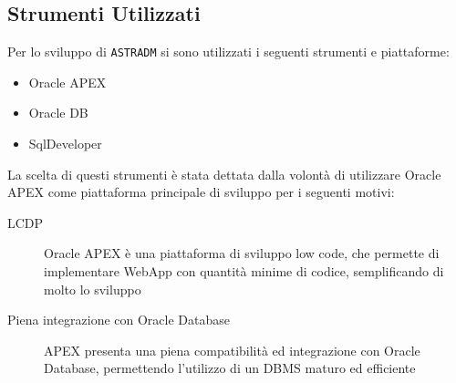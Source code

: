 \subsection{Strumenti Utilizzati}
Per lo sviluppo di \texttt{ASTRADM} si sono utilizzati i seguenti
strumenti e piattaforme:
\begin{itemize}
\item Oracle APEX
\item Oracle DB
\item SqlDeveloper
\end{itemize}

La scelta di questi strumenti è stata dettata dalla volontà
di utilizzare Oracle APEX come piattaforma principale di
sviluppo per i seguenti motivi:
\begin{description}
\item[LCDP] Oracle APEX è una piattaforma di sviluppo low code, che
  permette di implementare WebApp con quantità minime di codice,
  semplificando di molto lo sviluppo
\item[Piena integrazione con Oracle Database] APEX presenta una piena
  compatibilità ed integrazione con Oracle Database, permettendo
  l'utilizzo di un DBMS maturo ed efficiente
\end{description}

